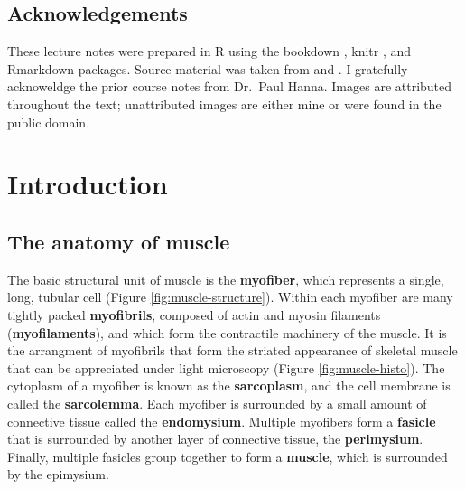\documentclass[openany]{book}
\begin{document}
\section*{Acknowledgements}\label{acknowledgements}

These lecture notes were prepared in R \citep{R-base} using the bookdown
\citep{xie2015}, knitr \citep{R-knitr}, and Rmarkdown
\citep{R-rmarkdown} packages. Source material was taken from
\citet{zachary2016pathologic} and \citet{maxie2015jubb}. I gratefully
acknoweldge the prior course notes from Dr.~Paul Hanna. Images are
attributed throughout the text; unattributed images are either mine or
were found in the public domain.

\chapter{Introduction}\label{intro}

\hypertarget{the-anatomy-of-muscle}{\section{The anatomy of
muscle}\label{the-anatomy-of-muscle}}

The basic structural unit of muscle is the \textbf{myofiber}, which
represents a single, long, tubular cell (Figure
\ref{fig:muscle-structure}). Within each myofiber are many tightly
packed \textbf{myofibrils}, composed of actin and myosin filaments
(\textbf{myofilaments}), and which form the contractile machinery of the
muscle. It is the arrangment of myofibrils that form the striated
appearance of skeletal muscle that can be appreciated under light
microscopy (Figure \ref{fig:muscle-histo}). The cytoplasm of a myofiber
is known as the \textbf{sarcoplasm}, and the cell membrane is called the
\textbf{sarcolemma}. Each myofiber is surrounded by a small amount of
connective tissue called the \textbf{endomysium}. Multiple myofibers
form a \textbf{fasicle} that is surrounded by another layer of
connective tissue, the \textbf{perimysium}. Finally, multiple fasicles
group together to form a \textbf{muscle}, which is surrounded by the
epimysium.
\end{document}
